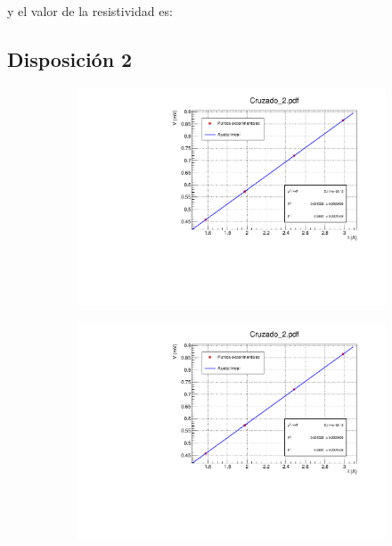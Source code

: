 \documentclass[11pt]{article}
\begin{document}

y el valor de la resistividad es: 



\newpage

\subsection{Disposición 2}


\begin{figure}[h!]\centering
\begin{subfigure}[b]{0.49\textwidth}
	\includegraphics[width=1.05\linewidth]{Programas/Cruzado_2.pdf}
\end{subfigure} \hfill
\begin{subfigure}[b]{0.49\textwidth}
	\includegraphics[width=1.05\linewidth]{Programas/Cruzado_2.pdf}
\end{subfigure}
\end{figure}
\end{document}
